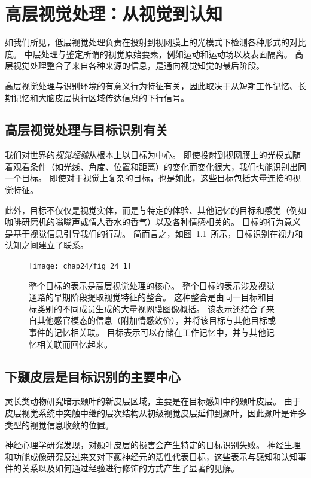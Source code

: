 \chapter{高层视觉处理：从视觉到认知} \label{chap:chap24}

如我们所见，低层视觉处理负责在投射到视网膜上的光模式下检测各种形式的对比度。
中层处理与鉴定所谓的视觉原始要素，例如运动和运动场以及表面隔离。
高层视觉处理整合了来自各种来源的信息，是通向视觉知觉的最后阶段。


高层视觉处理与识别环境的有意义行为特征有关，因此取决于从短期工作记忆、长期记忆和大脑皮层执行区域传达信息的下行信号。


\section{高层视觉处理与目标识别有关}

我们对世界的\textit{视觉经验}从根本上以目标为中心。
即使投射到视网膜上的光模式随着观看条件（如光线、角度、位置和距离）的变化而变化很大，我们也能识别出同一个目标。
即使对于视觉上复杂的目标，也是如此，这些目标包括大量连接的视觉特征。


此外，目标不仅仅是视觉实体，而是与特定的体验、其他记忆的目标和感觉（例如咖啡研磨机的嗡嗡声或情人香水的香气）以及各种情感相关的。
目标的行为意义是基于视觉信息引导我们的行动。
简而言之，如图~\ref{fig:24_1}~所示，目标识别在视力和认知之间建立了联系。


\begin{figure}[htbp]
	\centering
	\texttt{[image: chap24/fig\_24\_1]}
	\caption{整个目标的表示是高层视觉处理的核心。
		整个目标的表示涉及视觉通路的早期阶段提取视觉特征的整合。
		这种整合是由同一目标和目标类别的不同成员生成的大量视网膜图像概括。
		该表示还结合了来自其他感官模态的信息（附加情感效价），并将该目标与其他目标或事件的记忆相关联。
		目标表示可以存储在工作记忆中，并与其他记忆相关联而回忆起来。}
	\label{fig:24_1}
\end{figure}



\section{下颞皮层是目标识别的主要中心}

灵长类动物研究暗示颞叶的新皮层区域，主要是在目标感知中的颞叶皮层。
由于皮层视觉系统中突触中继的层次结构从初级视觉皮层延伸到颞叶，因此颞叶是许多类型的视觉信息收敛的位置。


神经心理学研究发现，对颞叶皮层的损害会产生特定的目标识别失败。
神经生理和功能成像研究反过来又对下颞神经元的活性代表目标，这些表示与感知和认知事件的关系以及如何通过经验进行修饰的方式产生了显著的见解。


